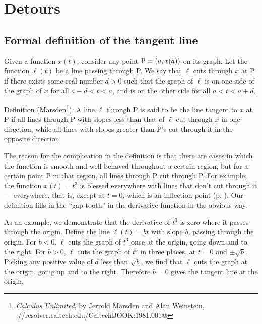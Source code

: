 \chapter*{Detours}



\newcommand{\detour}[2]{\section{#2}\label{detour:#1}}
\vfill
\detour{def-tangent}{Formal definition of the tangent line}

Given a function $x(t)$, consider any point $\textup{P}=(a,x(a))$ on its graph.
Let the function $\ell(t)$ be a line passing through P.
We say that $\ell$ cuts through $x$ at P if
there exists some real number $d>0$ such that
the graph of $\ell$ is on one side of the graph of $x$ for
all $a-d < t < a$, and is on the other side for all $a < t < a+d$.

Definition (Marsden\footnote{\emph{Calculus Unlimited}, by Jerrold
Marsden and Alan Weinstein, \verb@http://resolver.caltech.edu/CaltechBOOK:1981.001@}): A line $\ell$ through P is said to be the  line tangent to $x$ at P if all
lines through P with slopes less than that of $\ell$ cut through $x$
in one direction, while all lines with slopes greater than P's cut through
it in the opposite direction.

The reason for the complication in the definition is that 
there are cases in which the function is smooth and well-behaved throughout a certain
region, but for a certain point P in that region,
all lines through P cut through P.
For example, the function $x(t)=t^3$ is blessed everywhere with lines that don't
cut through it --- everywhere, that is,
except at $t=0$,
which is an inflection point (p. \pageref{inflection}).
Our definition fills in the
``gap tooth'' in the derivative function in the obvious way.

\begin{eg}
As an example, we demonstrate that the derivative of $t^3$ is zero where it passes through the origin.
Define the line $\ell(t)=bt$ with slope $b$, passing
through the origin. For $b<0$, $\ell$ cuts the graph of $t^3$ once at the origin, going down and to the right.
For $b>0$, $\ell$ cuts the graph of $t^3$ in three places, at $t=0$ and $\pm\sqrt{b}$.
Picking any positive value of  $d$ less than $\sqrt{b}$,
we find that $\ell$ cuts the graph at the origin, going up and to the right. Therefore
$b=0$ gives the tangent line at the origin.
\end{eg}


